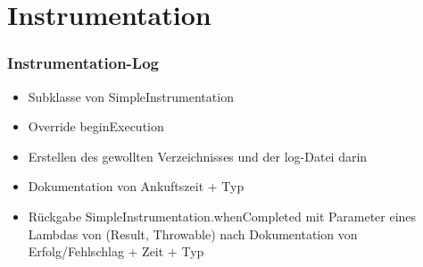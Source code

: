 \section*{Instrumentation}

\begin{frame}\frametitle{Instrumentation-Log}
    \begin{itemize} 
        \item Subklasse von \dq SimpleInstrumentation\dq{}
        \item Override \dq beginExecution\dq{} 
        \item Erstellen des gewollten Verzeichnisses und der log-Datei darin
        \item Dokumentation von Ankuftszeit + Typ
        \item Rückgabe SimpleInstrumentation.whenCompleted mit Parameter eines Lambdas 
              von \dq (Result, Throwable)\dq{} nach Dokumentation von Erfolg/Fehlschlag + Zeit + Typ
    \end{itemize}
\end{frame}
